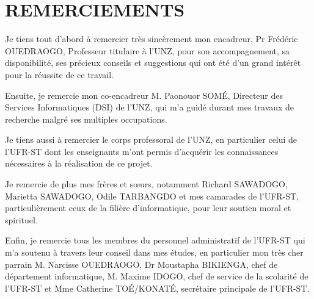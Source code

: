 \chapter*{REMERCIEMENTS}
\thispagestyle{MyStyle}

Je tiens tout d'abord à remercier très sincèrement mon encadreur, Pr Frédéric OUEDRAOGO, Professeur titulaire à l'UNZ, pour son accompagnement, sa disponibilité, ses précieux conseils et suggestions qui ont été d'un grand intérêt pour la réussite de ce travail.

Ensuite, je remercie mon co-encadreur M. Paonouor SOMÉ, Directeur des  Services Informatiques (DSI) de l'UNZ, qui m'a guidé durant mes travaux de recherche malgré ses multiples occupations.

Je tiens aussi à remercier le corps professoral de l’UNZ, en particulier celui de l’UFR-ST dont les enseignants m’ont permis d’acquérir les connaissances nécessaires à la réalisation de ce projet.

Je remercie de plus mes frères et sœurs, notamment Richard SAWADOGO, Marietta SAWADOGO, Odile TARBANGDO et mes camarades de l'UFR-ST, particulièrement ceux de la filière d'informatique, pour leur soutien moral et spirituel.

Enfin, je remercie tous les membres du personnel administratif de l'UFR-ST qui m'a soutenu à travers leur conseil dans mes études, en particulier mon très cher parrain M. Narcisse OUEDRAOGO, Dr Moustapha BIKIENGA, chef de département informatique, M. Maxime IDOGO, chef de service de la scolarité de l'UFR-ST et Mme Catherine TOÉ/KONATÉ, secrétaire principale de l'UFR-ST.